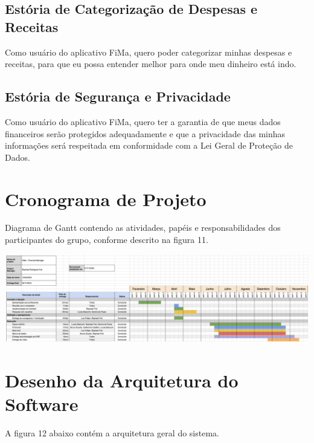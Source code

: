 \subsection{Estória de Categorização de Despesas e Receitas}
Como usuário do aplicativo FiMa, quero poder categorizar minhas despesas e receitas, para que eu possa entender melhor para onde meu dinheiro está indo.

\subsection{Estória de Segurança e Privacidade}
Como usuário do aplicativo FiMa, quero ter a garantia de que meus dados financeiros serão protegidos adequadamente e que a privacidade das minhas informações será respeitada em conformidade com a Lei Geral de Proteção de Dados.

\section{Cronograma de Projeto}

Diagrama de Gantt contendo as atividades, papéis e responsabilidades dos participantes do grupo, conforme descrito na figura 11.

    \vspace{\baselineskip}
    \begin{center}
        \begin{minipage}{\textwidth}
            \includegraphics[scale=0.35]{figs/gantt.png}
            \label{fig:gantt}
        \end{minipage}
    \end{center}
    

\section{Desenho da Arquitetura do Software}

A figura 12 abaixo contém a arquitetura geral do sistema.

